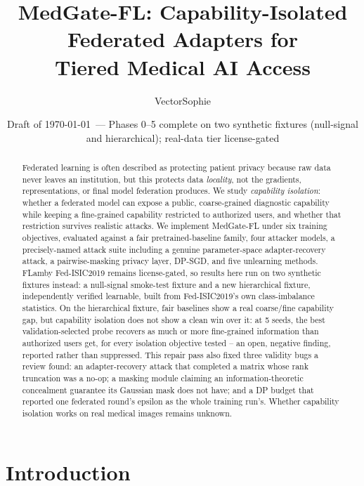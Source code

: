 \documentclass[11pt]{article}
\title{MedGate-FL: Capability-Isolated Federated Adapters for\\ Tiered Medical AI Access\\
\large \status{Preliminary technical report --- synthetic validation only, real-data tier license-gated}}
\author{VectorSophie}
\date{Draft of \today\ --- Phases 0--5 complete on two synthetic fixtures (null-signal and hierarchical); real-data tier license-gated}
\begin{document}
\maketitle

\begin{abstract}
Federated learning is often described as protecting patient privacy because
raw data never leaves an institution, but this protects data \emph{locality},
not the gradients, representations, or final model federation produces. We
study \emph{capability isolation}: whether a federated model can expose a
public, coarse-grained diagnostic capability while keeping a fine-grained
capability restricted to authorized users, and whether that restriction
survives realistic attacks. We implement MedGate-FL under six training
objectives, evaluated against a fair pretrained-baseline family, four
attacker models, a precisely-named attack suite including a genuine
parameter-space adapter-recovery attack, a pairwise-masking privacy layer,
DP-SGD, and five unlearning methods. FLamby Fed-ISIC2019 remains
license-gated, so results here run on two synthetic fixtures instead: a
null-signal smoke-test fixture and a new hierarchical fixture,
independently verified learnable, built from Fed-ISIC2019's own
class-imbalance statistics. On the hierarchical fixture, fair baselines
show a real coarse/fine capability gap, but capability isolation does not
show a clean win over it: at 5 seeds, the best validation-selected probe
recovers as much or more fine-grained information than authorized users
get, for every isolation objective tested -- an open, negative finding,
reported rather than suppressed. This repair pass also fixed three
validity bugs a review found: an adapter-recovery attack that completed a
matrix whose rank truncation was a no-op; a masking module claiming an
information-theoretic concealment guarantee its Gaussian mask does not
have; and a DP budget that reported one federated round's epsilon as the
whole training run's. Whether capability isolation works on real medical
images remains unknown.
\end{abstract}

\section{Introduction}
\end{document}
